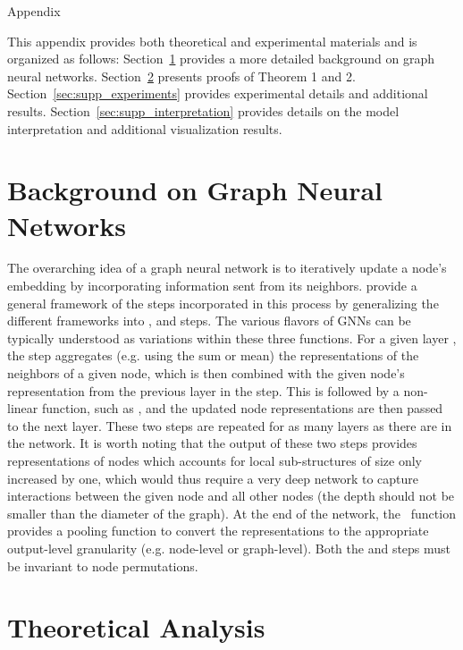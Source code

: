 \vspace*{0.3cm}
\begin{center}
    {\huge Appendix}
\end{center}
\vspace*{0.5cm}

\setcounter{theorem}{0}
This appendix provides both theoretical and experimental materials and is organized as follows: Section~\ref{sec:supp_background} provides a more detailed background on graph neural networks. Section~\ref{sec:supp_theory} presents proofs of Theorem 1 and 2. Section~\ref{sec:supp_experiments} provides experimental details and additional results. Section~\ref{sec:supp_interpretation} provides details on the model interpretation and additional visualization results.

\section{Background on Graph Neural Networks}\label{sec:supp_background}
The overarching idea of a graph neural network is to iteratively update a node's embedding by incorporating information sent from its neighbors. \citet{xu2018how} provide a general framework of the steps incorporated in this process by generalizing the different frameworks into ,  and  steps. The various flavors of GNNs can be typically understood as variations within these three functions. For a given layer , the  step aggregates (e.g. using the sum or mean) the representations of the neighbors of a given node, which is then combined with the given node's representation from the previous layer in the  step. This is followed by a non-linear function, such as , and the updated node representations are then passed to the next layer. These two steps are repeated for as many layers as there are in the network. It is worth noting that the output of these two steps provides representations of nodes which accounts for local sub-structures of size only increased by one, which would thus require a very deep network to capture interactions between the given node and all other nodes (the depth should not be smaller than the diameter of the graph). At the end of the network, the \READOUT\ function provides a pooling function to convert the representations to the appropriate output-level granularity (e.g. node-level or graph-level). Both the  and  steps must be invariant to node permutations.  

\section{Theoretical Analysis}\label{sec:supp_theory}
